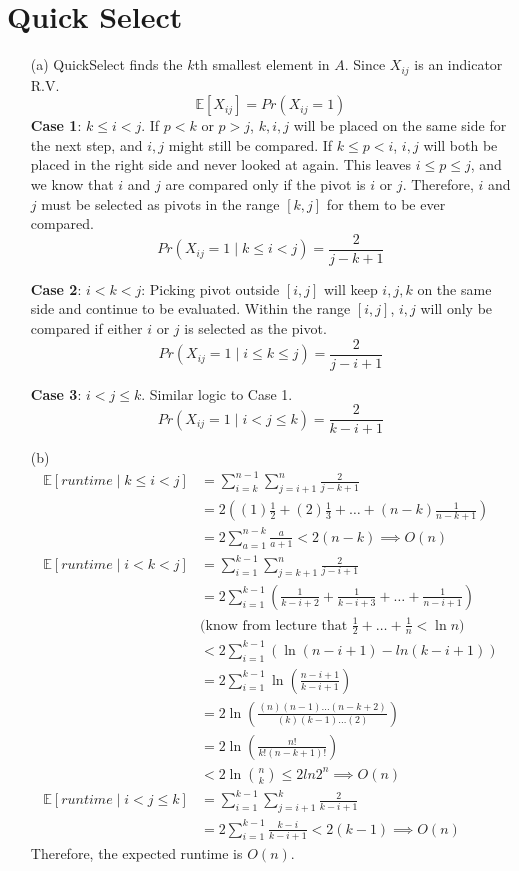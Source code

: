 \documentclass[11pt]{article}
\theoremstyle{definition}
\theoremstyle{remark}
\begin{document}
\section{Quick Select}
\begin{enumerate}
\item[(a)] QuickSelect finds the $k$th smallest element in $A$. Since $X_{ij}$ is an indicator R.V.
\[
\mathbb{E}[X_{ij}] = Pr(X_{ij} = 1)
\]
\textbf{Case 1}: $k \leq i < j$. If $p < k$ or $p > j$, $k, i, j$ will be placed on the same side for the next step, and $i,j$ might still be compared. If $k \leq p < i$, $i, j$ will both be placed in the right side and never looked at again. This leaves $i\leq p \leq j$, and we know that $i$ and $j$ are compared only if the pivot is $i$ or $j$. Therefore, $i$ and $j$ must be selected as pivots in the range $[k,j]$ for them to be ever compared.
\[
Pr(X_{ij} = 1 \mid k \leq i < j) = \frac{2}{j-k+1}
\]


\textbf{Case 2}: $i < k < j$: Picking pivot outside $[i,j]$ will keep $i,j,k$ on the same side and continue to be evaluated. Within the range $[i,j]$, $i,j$ will only be compared if either $i$ or $j$ is selected as the pivot.
\[
Pr(X_{ij} = 1 \mid i \leq k \leq j) = \frac{2}{j-i+1}
\]

\textbf{Case 3}: $i < j \leq k$. Similar logic to Case 1.
\[
Pr(X_{ij} = 1 \mid i < j \leq k) = \frac{2}{k-i+1}
\]
\clearpage
\item[(b)]
\begin{align*}
\mathbb{E}[runtime \mid k \leq i<j] &= \sum_{i=k}^{n-1}\sum_{j=i+1}^n \frac{2}{j-k+1} \\
&= 2\left((1)\frac{1}{2} + (2)\frac{1}{3} + \dots + (n-k)\frac{1}{n-k+1}\right) \\
&= 2 \sum_{a=1}^{n-k} \frac{a}{a+1} < 2(n-k) \implies O(n)\\
\mathbb{E}[runtime \mid i < k < j] &= \sum_{i=1}^{k-1}\sum_{j=k+1}^{n} \frac{2}{j-i+1} \\
&= 2 \sum_{i=1}^{k-1} \left(\frac{1}{k-i+2}+\frac{1}{k-i+3}+\dots+\frac{1}{n-i+1}     \right) \\
&\text{(know from lecture that $\frac{1}{2}+\dots+\frac{1}{n} < \ln n$)} \\
&< 2 \sum_{i=1}^{k-1} \left( \ln(n-i+1) - ln(k-i+1)   \right) \\
&= 2 \sum_{i=1}^{k-1} \ln\left( \frac{n-i+1}{k-i+1}   \right) \\
&= 2 \ln\left(\frac{(n)(n-1)\dots(n-k+2)}{(k)(k-1)\dots(2)}    \right) \\
&= 2 \ln\left(\frac{n!}{k!(n-k+1)!}\right) \\
&< 2 \ln\binom{n}{k} \leq 2 ln 2^n \implies O(n) \\
\mathbb{E}[runtime \mid i < j \leq k] &= \sum_{i=1}^{k-1}\sum_{j=i+1}^{k}\frac{2}{k-i+1} \\
&= 2 \sum_{i=1}^{k-1} \frac{k-i}{k-i+1} < 2(k-1) \implies O(n)
\end{align*}
Therefore, the expected runtime is $O(n)$.
\end{enumerate}
\clearpage
\end{document}
